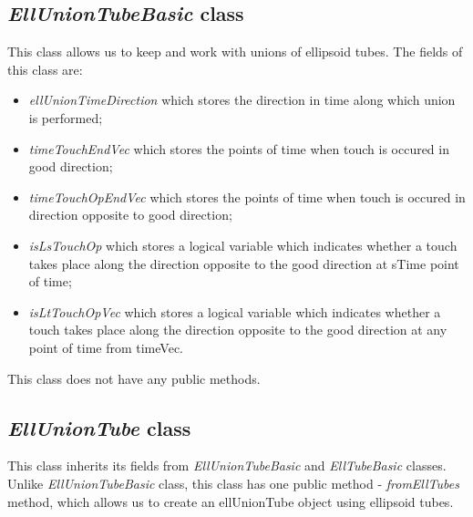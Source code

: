 \documentclass[letterpaper,10pt,english]{sphinxmanual}
\begin{document}
\subsection{\emph{EllUnionTubeBasic} class}
\label{chap_ellTube:elluniontubebasic-class}
This class allows us to keep and work with unions of ellipsoid tubes. The fields of this class are:
\begin{itemize}
\item {} 
\emph{ellUnionTimeDirection} which stores the direction in time along which union is performed;

\item {} 
\emph{timeTouchEndVec} which stores the points of time when touch is occured in good direction;

\item {} 
\emph{timeTouchOpEndVec} which stores the points of time when touch is occured in direction    opposite to good direction;

\item {} 
\emph{isLsTouchOp} which stores a logical variable which indicates whether a touch takes place    along the direction opposite to the good direction at sTime point of time;

\item {} 
\emph{isLtTouchOpVec} which stores a logical variable which indicates whether a touch takes place    along the direction opposite to the good direction at any point of time from timeVec.

\end{itemize}

This class does not have any public methods.


\subsection{\emph{EllUnionTube} class}
\label{chap_ellTube:elluniontube-class}
This class inherits its fields from \emph{EllUnionTubeBasic} and \emph{EllTubeBasic} classes. Unlike \emph{EllUnionTubeBasic} class, this class has one public method - \emph{fromEllTubes} method, which allows us to create an ellUnionTube object using ellipsoid tubes.
\end{document}
